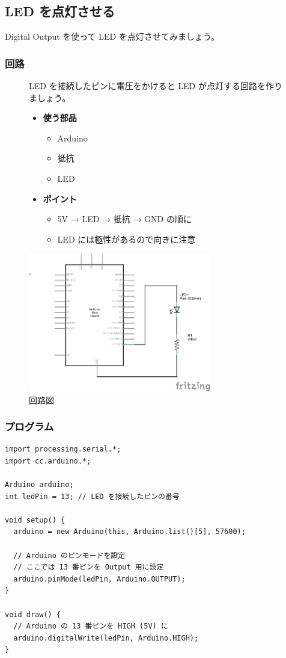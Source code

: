 \documentclass[11pt,a4paper]{jarticle}
\begin{document}
\subsection{LED を点灯させる}
Digital Output を使って LED を点灯させてみましょう。

\subsubsection*{回路}
\begin{figure}[h!]
 \begin{minipage}{0.5\columnwidth}
  LED を接続したピンに電圧をかけると LED が点灯する回路を作りましょう。
  \begin{itemize}
   \item \textbf{使う部品}
	 \begin{itemize}
	  \item Arduino
	  \item 抵抗
	  \item LED
	 \end{itemize}
   \item \textbf{ポイント}
	 \begin{itemize}
	  \item 5V → LED → 抵抗 → GND の順に
	  \item LED には極性があるので向きに注意
	 \end{itemize}
  \end{itemize}
 \end{minipage}
 \begin{minipage}{0.5\columnwidth}
  \centering
  \includegraphics[width=80mm]{img/02_led.eps}
  \caption{回路図}
 \end{minipage}
\end{figure}

\subsubsection*{プログラム}
\begin{lstlisting}
import processing.serial.*;
import cc.arduino.*;
 
Arduino arduino;
int ledPin = 13; // LED を接続したピンの番号
 
void setup() {
  arduino = new Arduino(this, Arduino.list()[5], 57600);

  // Arduino のピンモードを設定
  // ここでは 13 番ピンを Output 用に設定
  arduino.pinMode(ledPin, Arduino.OUTPUT);
}
 
void draw() {
  // Arduino の 13 番ピンを HIGH (5V) に
  arduino.digitalWrite(ledPin, Arduino.HIGH);
}
\end{lstlisting}
\end{document}
